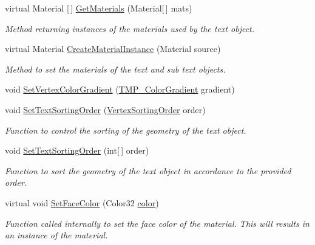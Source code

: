 \begin{DoxyCompactItemize}
\item 
virtual Material \mbox{[}$\,$\mbox{]} \mbox{\hyperlink{class_t_m_pro_1_1_t_m_p___text_a1979f92c718db50761d2773c9c724e81}{Get\+Materials}} (Material\mbox{[}$\,$\mbox{]} mats)
\begin{DoxyCompactList}\small\item\em Method returning instances of the materials used by the text object. \end{DoxyCompactList}\item 
virtual Material \mbox{\hyperlink{class_t_m_pro_1_1_t_m_p___text_a427ecf798a6c03dd9f3230b3ceaf1f61}{Create\+Material\+Instance}} (Material source)
\begin{DoxyCompactList}\small\item\em Method to set the materials of the text and sub text objects. \end{DoxyCompactList}\item 
void \mbox{\hyperlink{class_t_m_pro_1_1_t_m_p___text_a58e0c2575bd97d94fb49a000706ffcb3}{Set\+Vertex\+Color\+Gradient}} (\mbox{\hyperlink{class_t_m_pro_1_1_t_m_p___color_gradient}{T\+M\+P\+\_\+\+Color\+Gradient}} gradient)
\item 
void \mbox{\hyperlink{class_t_m_pro_1_1_t_m_p___text_a6679f4007ec2e6ad40093d9ef9dd3262}{Set\+Text\+Sorting\+Order}} (\mbox{\hyperlink{namespace_t_m_pro_a29c2b2e41c29850d1bc0760ac64b1ee0}{Vertex\+Sorting\+Order}} order)
\begin{DoxyCompactList}\small\item\em Function to control the sorting of the geometry of the text object. \end{DoxyCompactList}\item 
void \mbox{\hyperlink{class_t_m_pro_1_1_t_m_p___text_ae2ef03960db59b16eaa50cf1198cb1db}{Set\+Text\+Sorting\+Order}} (int\mbox{[}$\,$\mbox{]} order)
\begin{DoxyCompactList}\small\item\em Function to sort the geometry of the text object in accordance to the provided order. \end{DoxyCompactList}\item 
virtual void \mbox{\hyperlink{class_t_m_pro_1_1_t_m_p___text_a7737931333692ee9f01dd1e94cf68a45}{Set\+Face\+Color}} (Color32 \mbox{\hyperlink{class_t_m_pro_1_1_t_m_p___text_af874b3b1f2d1565c68e0c3ad9f79e5c4}{color}})
\begin{DoxyCompactList}\small\item\em Function called internally to set the face color of the material. This will results in an instance of the material. \end{DoxyCompactList}\item 

\end{DoxyCompactItemize}
